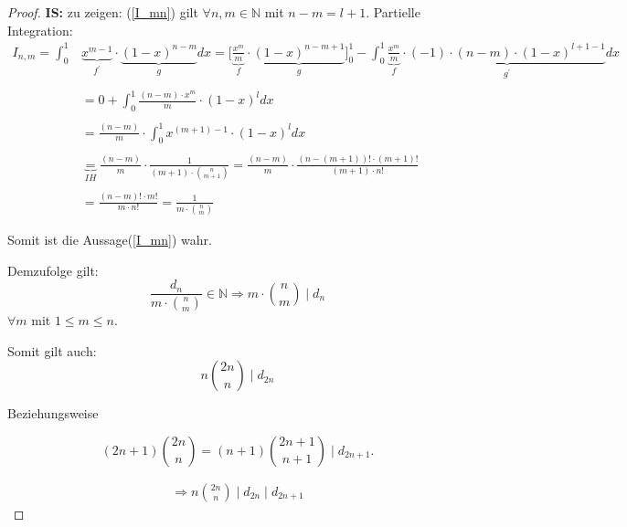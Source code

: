 \documentclass[12pt,oneside]{article}
\theoremstyle{remark}
\theoremstyle{definition}
\begin{document}
\begin{proof}
\textbf{IS:}
zu zeigen: (\ref{I_mn}) gilt $\forall n,m \in \mathbb{N}$ mit $ n - m = l + 1$.\newline\newline
Partielle Integration:\newline\newline
\begin{align*}
    I_{n,m} = \int_{0}^{1} &\underbrace{x^{m - 1}}_{f^{'}} \cdot \underbrace{(1 - x)^{n - m}}_{g} dx =\Big[ \underbrace{\frac{x^{m}}{m}}_{f} \cdot \underbrace{(1 - x)^{n - m + 1}}_{g}\Big]_0^1 - \int_{0}^{1} \underbrace{\frac{x^{m}}{m}}_{f} \cdot \underbrace{(-1 )\cdot (n - m) \cdot (1 -x)^{l + 1 - 1}}_{g^{'}} dx \\
    \\
    &= 0 +  \int_{0}^{1} \frac{(n - m) \cdot x^{m}}{m} \cdot (1 - x)^{l} dx \\
    \\
    &= \frac{(n - m )}{m} \cdot \int_{0}^{1} x^{(m + 1) - 1} \cdot (1-x)^{l} dx \\
    \\
    &\underbrace{=}_{IH} \frac{(n - m )}{m} \cdot \frac{1}{(m + 1) \cdot {n \choose m + 1}} = \frac{(n - m)}{m} \cdot \frac{(n - (m + 1))! \cdot (m + 1)!}{(m + 1) \cdot n!} \\ 
    \\ 
    &= \frac{(n - m )! \cdot m!}{m \cdot n!} = \frac{1}{m \cdot {n \choose m}} 
\end{align*}

Somit ist die Aussage(\ref{I_mn}) wahr.\newline 

Demzufolge gilt: 
\begin{equation}
    \frac{d_{n}}{m \cdot {n \choose m}} \in \mathbb{N} \Rightarrow  m \cdot {n \choose m} \mid d_{n}
\end{equation}
$\forall m $ mit $1 \leq m \leq n $.\newline

Somit gilt auch: 
\begin{equation}\label{d2n}
    n {2n\choose n} \mid d_{2n}
\end{equation}

Beziehungsweise 

\begin{equation}\label{d2n1}
    (2n + 1) {2n \choose n} = (n + 1) {2n + 1 \choose n + 1} \mid d_{2n + 1}. 
\end{equation}

\begin{align*}
\Rightarrow n {2n \choose n}\mid d_{2n}\mid d_{2n + 1}
\end{align*}
\smallskip


\end{proof}
\end{document}
